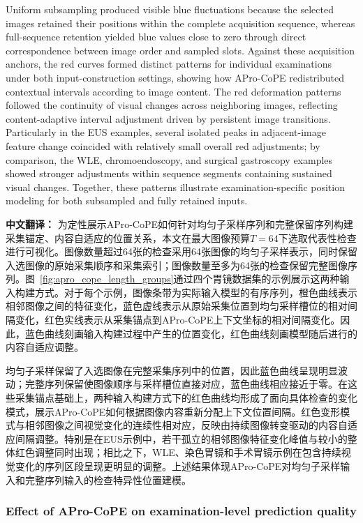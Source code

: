 \documentclass[Afour,sagev,times]{sagej}
\begin{document}
Uniform subsampling produced visible blue fluctuations because the selected images retained their positions within the complete acquisition sequence, whereas full-sequence retention yielded blue values close to zero through direct correspondence between image order and sampled slots. Against these acquisition anchors, the red curves formed distinct patterns for individual examinations under both input-construction settings, showing how APro-CoPE redistributed contextual intervals according to image content. The red deformation patterns followed the continuity of visual changes across neighboring images, reflecting content-adaptive interval adjustment driven by persistent image transitions. Particularly in the EUS examples, several isolated peaks in adjacent-image feature change coincided with relatively small overall red adjustments; by comparison, the WLE, chromoendoscopy, and surgical gastroscopy examples showed stronger adjustments within sequence segments containing sustained visual changes. Together, these patterns illustrate examination-specific position modeling for both subsampled and fully retained inputs.

\textbf{中文翻译：} 为定性展示APro-CoPE如何针对均匀子采样序列和完整保留序列构建采集锚定、内容自适应的位置关系，本文在最大图像预算$T=64$下选取代表性检查进行可视化。图像数量超过64张的检查采用64张图像的均匀子采样表示，同时保留入选图像的原始采集顺序和采集索引；图像数量至多为64张的检查保留完整图像序列。图~\ref{fig:apro_cope_length_groups}通过四个胃镜数据集的示例展示这两种输入构建方式。对于每个示例，图像条带为实际输入模型的有序序列，橙色曲线表示相邻图像之间的特征变化，蓝色虚线表示从原始采集位置到均匀采样槽位的相对间隔变化，红色实线表示从采集锚点到APro-CoPE上下文坐标的相对间隔变化。因此，蓝色曲线刻画输入构建过程中产生的位置变化，红色曲线刻画模型随后进行的内容自适应调整。

均匀子采样保留了入选图像在完整采集序列中的位置，因此蓝色曲线呈现明显波动；完整序列保留使图像顺序与采样槽位直接对应，蓝色曲线相应接近于零。在这些采集锚点基础上，两种输入构建方式下的红色曲线均形成了面向具体检查的变化模式，展示APro-CoPE如何根据图像内容重新分配上下文位置间隔。红色变形模式与相邻图像之间视觉变化的连续性相对应，反映由持续图像转变驱动的内容自适应间隔调整。特别是在EUS示例中，若干孤立的相邻图像特征变化峰值与较小的整体红色调整同时出现；相比之下，WLE、染色胃镜和手术胃镜示例在包含持续视觉变化的序列区段呈现更明显的调整。上述结果体现APro-CoPE对均匀子采样输入和完整序列输入的检查特异性位置建模。

\subsubsection{Effect of APro-CoPE on examination-level prediction quality}
\end{document}
